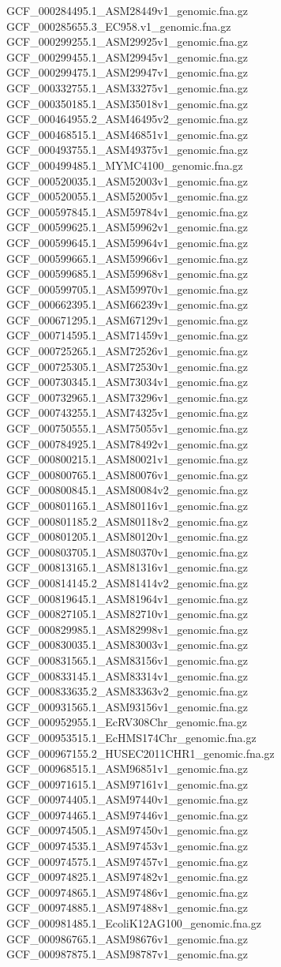 \documentclass[12pt, letterpaper]{article}
\begin{document}
\begin{verbatim*}
GCF_000284495.1_ASM28449v1_genomic.fna.gz
GCF_000285655.3_EC958.v1_genomic.fna.gz
GCF_000299255.1_ASM29925v1_genomic.fna.gz
GCF_000299455.1_ASM29945v1_genomic.fna.gz
GCF_000299475.1_ASM29947v1_genomic.fna.gz
GCF_000332755.1_ASM33275v1_genomic.fna.gz
GCF_000350185.1_ASM35018v1_genomic.fna.gz
GCF_000464955.2_ASM46495v2_genomic.fna.gz
GCF_000468515.1_ASM46851v1_genomic.fna.gz
GCF_000493755.1_ASM49375v1_genomic.fna.gz
GCF_000499485.1_MYMC4100_genomic.fna.gz
GCF_000520035.1_ASM52003v1_genomic.fna.gz
GCF_000520055.1_ASM52005v1_genomic.fna.gz
GCF_000597845.1_ASM59784v1_genomic.fna.gz
GCF_000599625.1_ASM59962v1_genomic.fna.gz
GCF_000599645.1_ASM59964v1_genomic.fna.gz
GCF_000599665.1_ASM59966v1_genomic.fna.gz
GCF_000599685.1_ASM59968v1_genomic.fna.gz
GCF_000599705.1_ASM59970v1_genomic.fna.gz
GCF_000662395.1_ASM66239v1_genomic.fna.gz
GCF_000671295.1_ASM67129v1_genomic.fna.gz
GCF_000714595.1_ASM71459v1_genomic.fna.gz
GCF_000725265.1_ASM72526v1_genomic.fna.gz
GCF_000725305.1_ASM72530v1_genomic.fna.gz
GCF_000730345.1_ASM73034v1_genomic.fna.gz
GCF_000732965.1_ASM73296v1_genomic.fna.gz
GCF_000743255.1_ASM74325v1_genomic.fna.gz
GCF_000750555.1_ASM75055v1_genomic.fna.gz
GCF_000784925.1_ASM78492v1_genomic.fna.gz
GCF_000800215.1_ASM80021v1_genomic.fna.gz
GCF_000800765.1_ASM80076v1_genomic.fna.gz
GCF_000800845.1_ASM80084v2_genomic.fna.gz
GCF_000801165.1_ASM80116v1_genomic.fna.gz
GCF_000801185.2_ASM80118v2_genomic.fna.gz
GCF_000801205.1_ASM80120v1_genomic.fna.gz
GCF_000803705.1_ASM80370v1_genomic.fna.gz
GCF_000813165.1_ASM81316v1_genomic.fna.gz
GCF_000814145.2_ASM81414v2_genomic.fna.gz
GCF_000819645.1_ASM81964v1_genomic.fna.gz
GCF_000827105.1_ASM82710v1_genomic.fna.gz
GCF_000829985.1_ASM82998v1_genomic.fna.gz
GCF_000830035.1_ASM83003v1_genomic.fna.gz
GCF_000831565.1_ASM83156v1_genomic.fna.gz
GCF_000833145.1_ASM83314v1_genomic.fna.gz
GCF_000833635.2_ASM83363v2_genomic.fna.gz
GCF_000931565.1_ASM93156v1_genomic.fna.gz
GCF_000952955.1_EcRV308Chr_genomic.fna.gz
GCF_000953515.1_EcHMS174Chr_genomic.fna.gz
GCF_000967155.2_HUSEC2011CHR1_genomic.fna.gz
GCF_000968515.1_ASM96851v1_genomic.fna.gz
GCF_000971615.1_ASM97161v1_genomic.fna.gz
GCF_000974405.1_ASM97440v1_genomic.fna.gz
GCF_000974465.1_ASM97446v1_genomic.fna.gz
GCF_000974505.1_ASM97450v1_genomic.fna.gz
GCF_000974535.1_ASM97453v1_genomic.fna.gz
GCF_000974575.1_ASM97457v1_genomic.fna.gz
GCF_000974825.1_ASM97482v1_genomic.fna.gz
GCF_000974865.1_ASM97486v1_genomic.fna.gz
GCF_000974885.1_ASM97488v1_genomic.fna.gz
GCF_000981485.1_EcoliK12AG100_genomic.fna.gz
GCF_000986765.1_ASM98676v1_genomic.fna.gz
GCF_000987875.1_ASM98787v1_genomic.fna.gz

\end{verbatim*}
\end{document}
